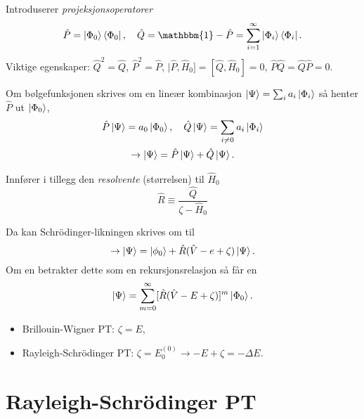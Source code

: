 \documentclass{beamer}
\begin{document}
\begin{frame}
	Introduserer \emph{projeksjonsoperatorer}
	\begin{equation}
		\hat P = \ket{\Phi_0}\bra{\Phi_0}, \quad \hat Q = \mathbbm{1} - \hat P = \sum_{i = 1}^{\infty} \ket{\Phi_i}\bra{\Phi_i}.
	\end{equation}
	Viktige egenskaper: $\hat Q^2 = \hat Q$, $\hat P^2 =  \hat P$, $|\hat P, \hat H_0] = [\hat Q, \hat H_0] = 0$, $\hat P \hat Q = \hat Q \hat P = 0$.

	Om bølgefunksjonen skrives om en lineær kombinasjon $\ket{\Psi} = \sum_i a_i \ket{\Phi_i}$ så henter $\hat P$ ut $\ket{\Phi_0}$,
	\begin{gather}
		\hat P \ket{\Psi} = a_0\ket{\Phi_0}, \quad \hat Q \ket{\Psi} = \sum_{i\neq 0} a_i \ket{\Phi_i}\\
		\rightarrow \ket{\Psi} = \hat P \ket{\Psi} + \hat Q \ket{\Psi}.
	\end{gather}

\end{frame}

\begin{frame}

	Innfører i tillegg den \emph{resolvente} (størrelsen) til $\hat H_0$
	\begin{equation}
		 \hat R \equiv \frac{\hat Q}{\zeta - \hat H_0} 
	\end{equation}
	
	Da kan Schrödinger-likningen skrives om til
	\begin{equation}
		\rightarrow \ket{\Psi} = \ket{\phi_0} + \hat R(\hat V - e + \zeta)\ket{\Psi}.
	\end{equation}
	Om en betrakter dette som en rekursjonsrelasjon så får en
	\begin{equation}
		\ket{\Psi} = \sum_{m=0}^\infty [\hat R(\hat V - E + \zeta)]^m \ket{\Phi_0}.
	\end{equation}
	
	\begin{itemize}
		\item Brillouin-Wigner PT: $\zeta = E$,
		\item Rayleigh-Schrödinger PT: $\zeta = E_0^{(0)} \to -E + \zeta = - \Delta E$.  	
	\end{itemize}	
	
\end{frame}


\section{Rayleigh-Schrödinger PT}
\end{document}
